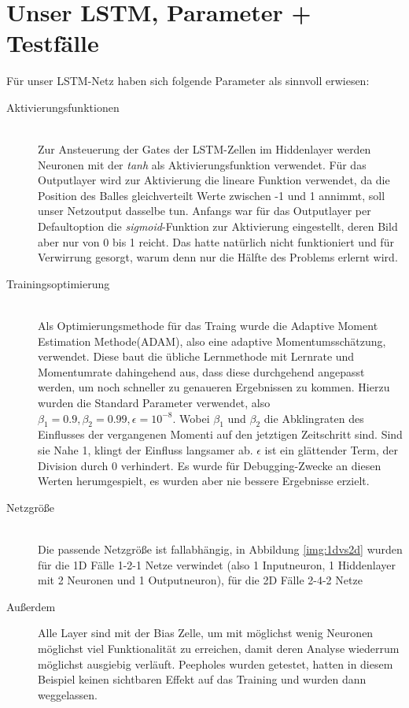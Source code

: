 \section{Unser LSTM, Parameter + Testfälle}
Für unser LSTM-Netz haben sich folgende Parameter als sinnvoll erwiesen:
\begin{description}	\item[Aktivierungsfunktionen]\hfill \\ 
	Zur Ansteuerung der Gates der LSTM-Zellen im Hiddenlayer werden Neuronen mit der \textit{tanh} als Aktivierungsfunktion verwendet. Für das Outputlayer wird zur Aktivierung die lineare Funktion verwendet, da die Position des Balles gleichverteilt Werte zwischen -1 und 1 annimmt, soll unser Netzoutput dasselbe tun. Anfangs war für das Outputlayer per Defaultoption die \textit{sigmoid}-Funktion zur Aktivierung eingestellt, deren Bild aber nur von 0 bis 1 reicht. Das hatte natürlich nicht funktioniert und für Verwirrung gesorgt, warum denn nur die Hälfte des Problems erlernt wird.  
	\item[Trainingsoptimierung]\hfill \\ 
	Als Optimierungsmethode für das Traing wurde die Adaptive Moment Estimation Methode(ADAM), also eine adaptive Momentumsschätzung, verwendet. Diese baut die übliche Lernmethode mit Lernrate und Momentumrate dahingehend aus, dass diese durchgehend angepasst werden, um noch schneller zu genaueren Ergebnissen zu kommen. Hierzu wurden die Standard Parameter verwendet, also $ \beta_{1}=0.9, \beta_{2}=0.99, \epsilon = 10^{-8}$. Wobei $ \beta_{1} $ und $ \beta_{2} $ die Abklingraten des Einflusses der vergangenen Momenti auf den jetztigen Zeitschritt sind. Sind sie Nahe 1, klingt der Einfluss langsamer ab. $ \epsilon$ ist ein glättender Term, der Division durch 0 verhindert. \cite{bib:adam} Es wurde für Debugging-Zwecke an diesen Werten herumgespielt, es wurden aber nie bessere Ergebnisse erzielt. 
	\item[Netzgröße]\hfill \\ 
	Die passende Netzgröße ist  fallabhängig, in Abbildung \ref{img:1dvs2d} wurden für die 1D Fälle 1-2-1 Netze verwindet (also 1 Inputneuron, 1 Hiddenlayer mit 2 Neuronen und 1 Outputneuron), für die 2D Fälle 2-4-2 Netze 
	\item[Außerdem]
	Alle Layer sind mit der Bias Zelle, um mit möglichst wenig Neuronen möglichst viel Funktionalität zu erreichen, damit deren Analyse wiederrum möglichst ausgiebig verläuft. Peepholes \cite{lstm2} wurden getestet, hatten in diesem Beispiel keinen sichtbaren Effekt auf das Training und wurden dann weggelassen.  
\end{description}




